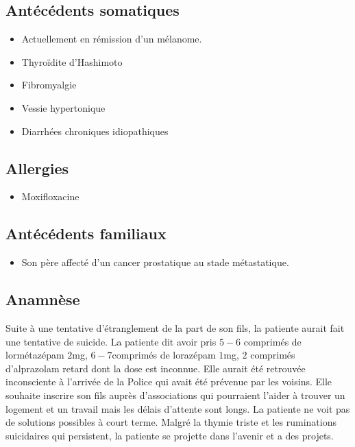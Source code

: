 \subsection{Antécédents somatiques}
\begin{itemize}[label=\textbullet]
    \item Actuellement en rémission d’un mélanome.
    \item Thyroïdite d’Hashimoto  
    \item Fibromyalgie
    \item Vessie hypertonique
    \item Diarrhées chroniques idiopathiques
\end{itemize}

\subsection{Allergies}
\begin{itemize}[label=\textbullet]
    \item Moxifloxacine 
\end{itemize}
 
\subsection{Antécédents familiaux}
\begin{itemize}[label=\textbullet]
    \item Son père affecté d’un cancer prostatique au stade métastatique. 
\end{itemize}

\subsection{Anamnèse}  
Suite à une tentative d’étranglement de la part de son fils, la patiente aurait fait une tentative de suicide. La patiente dit avoir pris $5-6$ comprimés de lormétazépam $2$mg, $6-7$comprimés de lorazépam $1$mg, $2$ comprimés d'alprazolam retard dont la dose est inconnue. Elle aurait été retrouvée inconsciente à l’arrivée de la Police qui avait été prévenue par les voisins. Elle souhaite inscrire son fils auprès d’associations qui pourraient l’aider à trouver un logement et un travail mais les délais d’attente sont longs. La patiente ne voit pas de solutions possibles à court terme. Malgré la thymie triste et les ruminations suicidaires qui persistent, la patiente se projette dans l’avenir et a des projets. 

